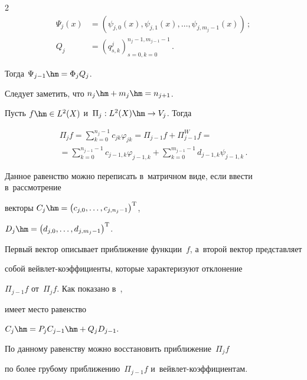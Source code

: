 \begin{multicols}{2}
\begin{align*}


\Psi _{j} (x)&=\left(\psi _{j,0} (x),\psi _{j,1} (x),\ldots,\psi_{j,m_{j} -1}


 (x)\right)\,;\\


{Q}_{j}&=\left(q_{s,k}^{j} \right)_{s=0, k=0}^{n_{j}-1,m_{j-1}-1}\,.


\end{align*}


Тогда $\Psi _{j-1} \hm=\Phi _{j} {Q}_{j} $. 


Следует заметить, что $n_{j} \hm+m_{j} \hm=n_{j+1} $.


Пусть $f\hm\in {L}^{2} (X)$ и~$\Pi _{j} : {L}^{2} (X)\hm\to V_{j} $. Тогда


\begin{multline*}


\Pi _{j} f=\sum\limits_{k=0}^{n_{j} -1}c_{jk} \varphi _{jk}  =


\Pi _{j-1} f+\Pi _{j-1}^{W} f={}\\


{}=\sum\limits_{k=0}^{n_{j-1} -1}c_{j-1,k} \varphi _{j-1,k}  +


\sum\limits_{k=0}^{m_{j-1} -1}d_{j-1,k} \psi _{j-1,k}\,.


\end{multline*}


Данное равенство можно переписать в~матричном виде, если ввести в~рассмотрение 


векторы ${C}_{j} \hm=\left(c_{j,0} ,\dots,c_{j,n_{j} -1} \right)^{\mathrm{T}}$,


${D}_{j} \hm=\left(d_{j,0} ,\dots,d_{j,m_{j} -1} \right)^{\mathrm{T}}$. 


Первый вектор описывает приближение функции~$f$, а~второй вектор представляет 


собой вейв\-лет-ко\-эф\-фи\-ци\-ен\-ты, которые характеризуют отклонение


$\Pi _{j-1} f$ от~$\Pi _{j} f$. Как показано в~\cite{ArticleFinkelstein}, 


имеет место равенство


${C}_{j} \hm={P}_{j} {C}_{j-1} \hm+{Q}_{j} {D}_{j-1}.$


По данному равенству можно восстановить приближение~$\Pi _{j} f$ 


по более грубому приближению~$\Pi _{j-1} f$ и~вейв\-лет-ко\-эф\-фи\-ци\-ен\-там.






\end{multicols}
